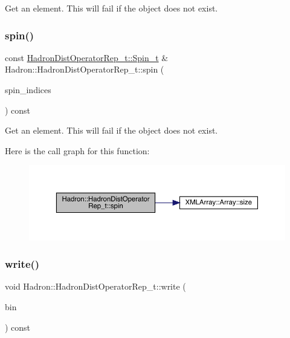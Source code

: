 Get an element. This will fail if the object does not exist. 

\mbox{\label{classHadron_1_1HadronDistOperatorRep__t_afdc4b290b39dd14deb08a54cec303f5f}} 
\subsubsection{\texorpdfstring{spin()}{spin()}\hspace{0.1cm}{\footnotesize\ttfamily [16/16]}}
{\footnotesize\ttfamily const \mbox{\hyperlink{structHadron_1_1HadronDistOperatorRep__t_1_1Spin__t}{Hadron\+Dist\+Operator\+Rep\+\_\+t\+::\+Spin\+\_\+t}} \& Hadron\+::\+Hadron\+Dist\+Operator\+Rep\+\_\+t\+::spin (\begin{DoxyParamCaption}\item[{const \mbox{\hyperlink{classXMLArray_1_1Array}{Array}}$<$ int $>$ \&}]{spin\+\_\+indices }\end{DoxyParamCaption}) const}



Get an element. This will fail if the object does not exist. 

Here is the call graph for this function\+:
\nopagebreak
\begin{figure}[H]
\begin{center}
\leavevmode
\includegraphics[width=350pt]{dd/de0/classHadron_1_1HadronDistOperatorRep__t_afdc4b290b39dd14deb08a54cec303f5f_cgraph}
\end{center}
\end{figure}
\mbox{\label{classHadron_1_1HadronDistOperatorRep__t_a13c4b6d851e65136c55ccee152e72a12}} 
\subsubsection{\texorpdfstring{write()}{write()}\hspace{0.1cm}{\footnotesize\ttfamily [1/2]}}
{\footnotesize\ttfamily void Hadron\+::\+Hadron\+Dist\+Operator\+Rep\+\_\+t\+::write (\begin{DoxyParamCaption}\item[{\mbox{\hyperlink{classADATIO_1_1BinaryWriter}{A\+D\+A\+T\+I\+O\+::\+Binary\+Writer}} \&}]{bin }\end{DoxyParamCaption}) const}



